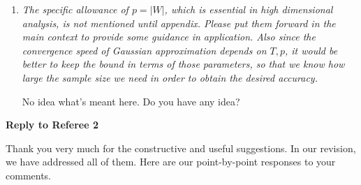 \documentclass[a4paper,12pt]{article}
\begin{document}
\begin{enumerate}[label=(\arabic*),leftmargin=0.7cm]
\begin{enumerate}[label=(\alph*),leftmargin=0.7cm]
\end{enumerate}


\item \textit{The specific allowance of $p = |W|$, which is essential in high dimensional analysis, is not mentioned until appendix. Please put them forward in the main context to provide some guidance in application. Also since the convergence speed of Gaussian approximation depends on $T, p$, it would be better to keep the bound in terms of those parameters, so that we know how large the sample size we need in order to obtain the desired accuracy.}

{\color{red} No idea what's meant here. Do you have any idea?} 


\end{enumerate}



\newpage
\begin{center}
{\large \bf Reply to Referee 2} 
\end{center}


Thank you very much for the constructive and useful suggestions. In our revision, we have addressed all of them. Here are our point-by-point responses to your comments. 
\end{document}
